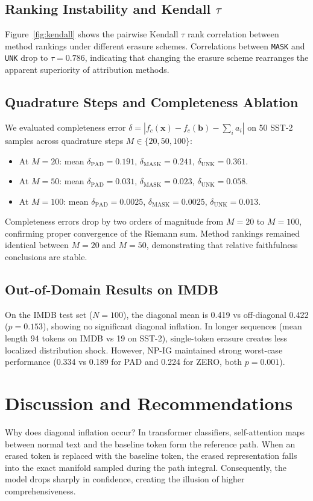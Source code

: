 \documentclass[11pt]{article}
\begin{document}
\subsection{Ranking Instability and Kendall $\tau$}
Figure~\ref{fig:kendall} shows the pairwise Kendall $\tau$ rank correlation between method rankings under different erasure schemes. Correlations between \texttt{MASK} and \texttt{UNK} drop to $\tau=0.786$, indicating that changing the erasure scheme rearranges the apparent superiority of attribution methods.

\subsection{Quadrature Steps and Completeness Ablation}
\label{sec:ablations}
We evaluated completeness error $\delta = |f_c(\mathbf{x}) - f_c(\mathbf{b}) - \sum_i a_i|$ on 50 SST-2 samples across quadrature steps $M \in \{20, 50, 100\}$:
\begin{itemize}
    \item At $M=20$: mean $\delta_{\text{PAD}}=0.191$, $\delta_{\text{MASK}}=0.241$, $\delta_{\text{UNK}}=0.361$.
    \item At $M=50$: mean $\delta_{\text{PAD}}=0.031$, $\delta_{\text{MASK}}=0.023$, $\delta_{\text{UNK}}=0.058$.
    \item At $M=100$: mean $\delta_{\text{PAD}}=0.0025$, $\delta_{\text{MASK}}=0.0025$, $\delta_{\text{UNK}}=0.013$.
\end{itemize}
Completeness errors drop by two orders of magnitude from $M=20$ to $M=100$, confirming proper convergence of the Riemann sum. Method rankings remained identical between $M=20$ and $M=50$, demonstrating that relative faithfulness conclusions are stable.

\subsection{Out-of-Domain Results on IMDB}
On the IMDB test set ($N=100$), the diagonal mean is 0.419 vs off-diagonal 0.422 ($p=0.153$), showing no significant diagonal inflation. In longer sequences (mean length 94 tokens on IMDB vs 19 on SST-2), single-token erasure creates less localized distribution shock. However, NP-IG maintained strong worst-case performance (0.334 vs 0.189 for PAD and 0.224 for ZERO, both $p=0.001$).

\section{Discussion and Recommendations}
\label{sec:discussion}
Why does diagonal inflation occur? In transformer classifiers, self-attention maps between normal text and the baseline token form the reference path. When an erased token is replaced with the baseline token, the erased representation falls into the exact manifold sampled during the path integral. Consequently, the model drops sharply in confidence, creating the illusion of higher comprehensiveness.
\end{document}
